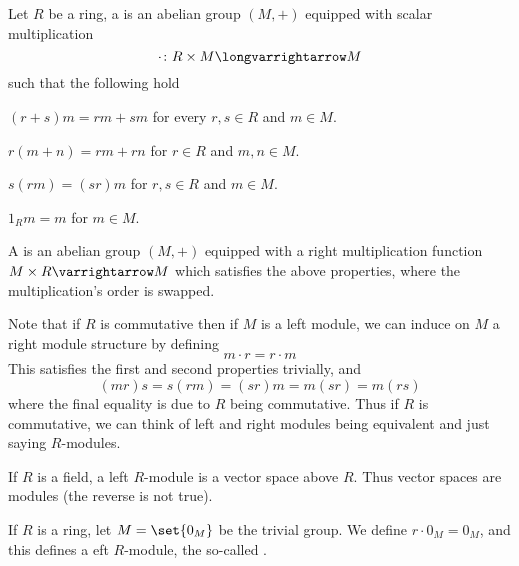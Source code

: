 \documentclass[10pt]{article}
\let\to=\varrightarrow
\let\longto=\longvarrightarrow
\begin{document}


\bigskip

\begin{defn*}

    Let $R$ be a ring, a  is an abelian group $(M,+)$ equipped with scalar multiplication
    \[ \cdot\colon R\times M\longto M \]
    such that the following hold
    \benum
        \item $(r+s)m=rm+sm$ for every $r,s\in R$ and $m\in M$.
        \item $r(m+n)=rm+rn$ for $r\in R$ and $m,n\in M$.
        \item $s(rm)=(sr)m$ for $r,s\in R$ and $m\in M$.
        \item $1_Rm=m$ for $m\in M$.
    \eenum

    A  is an abelian group $(M,+)$ equipped with a right multiplication function $M\times R\to M$ which satisfies the above properties, where the multiplication's order is swapped.

\end{defn*}

Note that if $R$ is commutative then if $M$ is a left module, we can induce on $M$ a right module structure by defining
\[ m\cdot r = r\cdot m \]
This satisfies the first and second properties trivially, and
\[ (mr)s = s(rm) = (sr)m = m(sr) = m(rs) \]
where the final equality is due to $R$ being commutative.
Thus if $R$ is commutative, we can think of left and right modules being equivalent and just saying $R$-modules.

\begin{note}

    If $R$ is a field, a left $R$-module is a vector space above $R$.
    Thus vector spaces are modules (the reverse is not true).

\end{note}

\begin{exam*}

    If $R$ is a ring, let $M=\set{0_M}$ be the trivial group.
    We define $r\cdot0_M=0_M$, and this defines a eft $R$-module, the so-called .

\end{exam*}
\end{document}

